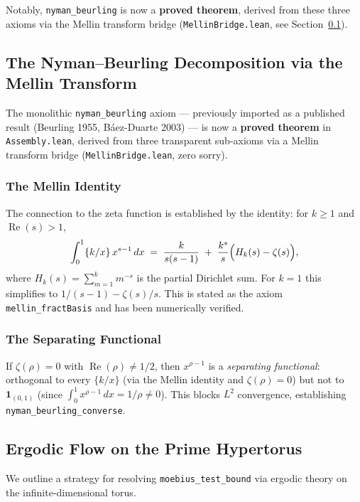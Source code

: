 \documentclass[11pt,a4paper]{article}
\theoremstyle{definition}
\theoremstyle{remark}
\newcommand{\lean}[1]{\texttt{#1}}
\begin{document}
\noindent Notably, \lean{nyman\_beurling} is now a \textbf{proved
theorem}, derived from these three axioms via the Mellin transform
bridge (\texttt{MellinBridge.lean}, see Section~\ref{sec:mellin}).

\subsection{The Nyman--Beurling Decomposition via the Mellin Transform}
\label{sec:mellin}

The monolithic \lean{nyman\_beurling} axiom --- previously imported as a
published result (Beurling 1955, B\'aez-Duarte 2003) --- is now a
\textbf{proved theorem} in \texttt{Assembly.lean}, derived from
three transparent sub-axioms via a Mellin transform bridge
(\texttt{MellinBridge.lean}, zero sorry).

\subsubsection*{The Mellin Identity}

The connection to the zeta function is established by the identity:
for $k \geq 1$ and $\operatorname{Re}(s) > 1$,
\[
  \int_0^1 \{k/x\}\,x^{s-1}\,dx
  \;=\;
  \frac{k}{s(s-1)}
  \;+\;
  \frac{k^s}{s}\Bigl(H_k(s) - \zeta(s)\Bigr),
\]
where $H_k(s) = \sum_{m=1}^{k} m^{-s}$ is the partial Dirichlet
sum. For $k = 1$ this simplifies to $1/(s-1) - \zeta(s)/s$.
This is stated as the axiom \lean{mellin\_fractBasis} and has been
numerically verified.

\subsubsection*{The Separating Functional}

If $\zeta(\rho) = 0$ with $\operatorname{Re}(\rho) \neq 1/2$, then
$x^{\rho-1}$ is a \emph{separating functional}: orthogonal to
every $\{k/x\}$ (via the Mellin identity and $\zeta(\rho) = 0$) but
not to $\mathbf{1}_{(0,1)}$ (since $\int_0^1 x^{\rho-1}\,dx =
1/\rho \neq 0$). This blocks $L^2$ convergence, establishing
\lean{nyman\_beurling\_converse}.

\subsection{Ergodic Flow on the Prime Hypertorus}
\label{sec:hypertorus}

We outline a strategy for resolving \lean{moebius\_test\_bound}
via ergodic theory on the infinite-dimensional torus.
\end{document}

